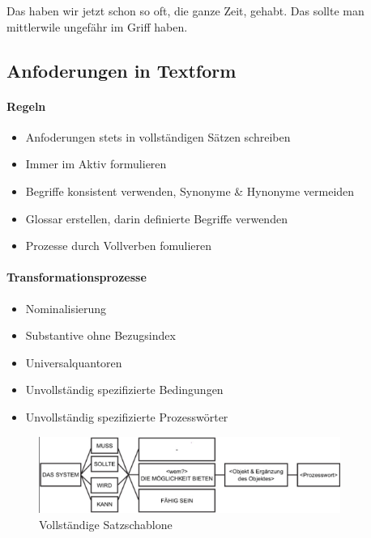 \documentclass[a4paper]{article}
\begin{document}
				Das haben wir jetzt schon so oft, die ganze Zeit, gehabt.
				Das sollte man mittlerwile ungefähr im Griff haben.
				
			\subsection{Anfoderungen in Textform}
			
					\paragraph{Regeln}
					
						\begin{itemize}
							\item Anfoderungen stets in vollständigen Sätzen schreiben
							\item Immer im Aktiv formulieren
							\item Begriffe konsistent verwenden, Synonyme \& Hynonyme vermeiden
							\item Glossar erstellen, darin definierte Begriffe verwenden
							\item Prozesse durch Vollverben fomulieren
						\end{itemize}
					
					\paragraph{Transformationsprozesse}
					
						\begin{itemize}
							\item Nominalisierung
							\item Substantive ohne Bezugsindex
							\item Universalquantoren
							\item Unvollständig spezifizierte Bedingungen
							\item Unvollständig spezifizierte Prozesswörter
						\end{itemize}
					
					\begin{figure}[!htb]
						\centering
						\includegraphics[height=2.5cm]{img/re/03/satzschablone.png}
						\caption{Vollständige Satzschablone}
						\label{fig:re_satzschablone}
					\end{figure}
					
\end{document}
